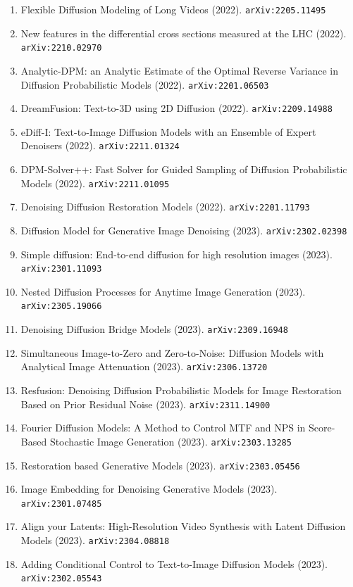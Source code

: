 \documentclass[11pt]{article}
\begin{document}
\begin{enumerate}
  \item Flexible Diffusion Modeling of Long Videos (2022). \texttt{arXiv:2205.11495}
  \item New features in the differential cross sections measured at the LHC (2022). \texttt{arXiv:2210.02970}
  \item Analytic-DPM: an Analytic Estimate of the Optimal Reverse Variance in
  Diffusion Probabilistic Models (2022). \texttt{arXiv:2201.06503}
  \item DreamFusion: Text-to-3D using 2D Diffusion (2022). \texttt{arXiv:2209.14988}
  \item eDiff-I: Text-to-Image Diffusion Models with an Ensemble of Expert
  Denoisers (2022). \texttt{arXiv:2211.01324}
  \item DPM-Solver++: Fast Solver for Guided Sampling of Diffusion Probabilistic Models (2022). \texttt{arXiv:2211.01095}
  \item Denoising Diffusion Restoration Models (2022). \texttt{arXiv:2201.11793}
  \item Diffusion Model for Generative Image Denoising (2023). \texttt{arXiv:2302.02398}
  \item Simple diffusion: End-to-end diffusion for high resolution images (2023). \texttt{arXiv:2301.11093}
  \item Nested Diffusion Processes for Anytime Image Generation (2023). \texttt{arXiv:2305.19066}
  \item Denoising Diffusion Bridge Models (2023). \texttt{arXiv:2309.16948}
  \item Simultaneous Image-to-Zero and Zero-to-Noise: Diffusion Models with
  Analytical Image Attenuation (2023). \texttt{arXiv:2306.13720}
  \item Resfusion: Denoising Diffusion Probabilistic Models for Image
  Restoration Based on Prior Residual Noise (2023). \texttt{arXiv:2311.14900}
  \item Fourier Diffusion Models: A Method to Control MTF and NPS in Score-Based
  Stochastic Image Generation (2023). \texttt{arXiv:2303.13285}
  \item Restoration based Generative Models (2023). \texttt{arXiv:2303.05456}
  \item Image Embedding for Denoising Generative Models (2023). \texttt{arXiv:2301.07485}
  \item Align your Latents: High-Resolution Video Synthesis with Latent
  Diffusion Models (2023). \texttt{arXiv:2304.08818}
  \item Adding Conditional Control to Text-to-Image Diffusion Models (2023). \texttt{arXiv:2302.05543}

\end{enumerate}
\end{document}
